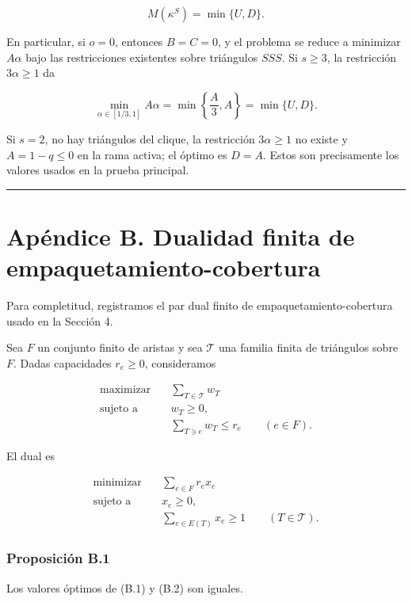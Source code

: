 \documentclass[
  11pt,
]{article}
\begin{document}
\[
M(\kappa^S)=\min\{U,D\}.
\]

En particular, si \(o=0\), entonces \(B=C=0\), y el problema se reduce a
minimizar \(A\alpha\) bajo las restricciones existentes sobre triángulos
\(SSS\). Si \(s\ge3\), la restricción \(3\alpha\ge1\) da

\[
\min_{\alpha\in[1/3,1]}A\alpha
=
\min\left\{\frac A3,A\right\}
=
\min\{U,D\}.
\]

Si \(s=2\), no hay triángulos del clique, la restricción \(3\alpha\ge1\)
no existe y \(A=1-q\le0\) en la rama activa; el óptimo es \(D=A\). Estos
son precisamente los valores usados en la prueba principal.

\begin{center}\rule{0.5\linewidth}{0.5pt}\end{center}

\section{Apéndice B. Dualidad finita de
empaquetamiento-cobertura}\label{apuxe9ndice-b.-dualidad-finita-de-empaquetamiento-cobertura}

Para completitud, registramos el par dual finito de
empaquetamiento-cobertura usado en la Sección 4.

Sea \(F\) un conjunto finito de aristas y sea \(\mathcal T\) una familia
finita de triángulos sobre \(F\). Dadas capacidades \(r_e\ge0\),
consideramos

\[
\begin{aligned}
\text{maximizar}\quad
&\sum_{T\in\mathcal T}w_T\\
\text{sujeto a}\quad
&w_T\ge0,\\
&\sum_{T\ni e}w_T\le r_e
\qquad(e\in F).
\end{aligned}
\tag{B.1}
\]

El dual es

\[
\begin{aligned}
\text{minimizar}\quad
&\sum_{e\in F}r_ex_e\\
\text{sujeto a}\quad
&x_e\ge0,\\
&\sum_{e\in E(T)}x_e\ge1
\qquad(T\in\mathcal T).
\end{aligned}
\tag{B.2}
\]

\subsubsection{Proposición B.1}\label{proposiciuxf3n-b.1}

Los valores óptimos de (B.1) y (B.2) son iguales.
\end{document}
